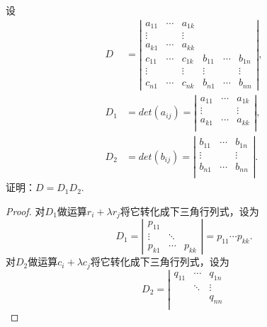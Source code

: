 \documentclass[10pt,a4paper%
tablecaptionabove]{article}
\newcommand{\cd}{\cdots}
\newcommand{\dd}{\ddots}
\newcommand{\vd}{\vdots}
\begin{document}
\begin{CJK}{UTF8}{gkai}
\begin{li}
  设
  $$
  \begin{aligned}
    D &= \left|
      \begin{array}{cccccc}
        a_{11} & \cd & a_{1k} &    &    &   \\
        \vd    &     &  \vd  &    &    &   \\
        a_{k1} & \cd & a_{kk} &    &    &   \\
        c_{11} & \cd & c_{1k} & b_{11}&  \cd & b_{1n}   \\
        \vd    &     & \vd   & \vd  &    & \vd \\
        c_{n1} & \cd & c_{nk} & b_{n1}&  \cd & b_{nn}
      \end{array}
    \right|, \\
    D_1 &= det(a_{ij}) = \left|
      \begin{array}{ccc}
        a_{11} & \cd & a_{1k} \\
        \vd    &     &  \vd  \\
        a_{k1} & \cd & a_{kk} \\
      \end{array}
    \right|, \\
    D_2 & = det(b_{ij}) = \left|
      \begin{array}{ccc}
        b_{11} & \cd & b_{1n} \\
        \vd    &     &  \vd  \\
        b_{n1} & \cd & b_{nn} \\
      \end{array}
    \right|.
  \end{aligned}
  $$
  证明：$D=D_1D_2$.
\end{li}
\begin{proof}
  对$D_1$做运算$r_i+\lambda r_j$将它转化成下三角行列式，设为
  $$
  D_1 =  \left|
    \begin{array}{ccc}
      p_{11} &       & \\
      \vd    & \dd  &  \\
      p_{k1} & \cd   & p_{kk} 
    \end{array}
  \right| = p_{11} \cd p_{kk}.
  $$ 
  对$D_2$做运算$c_i+\lambda c_j$将它转化成下三角行列式，设为
  $$
  D_2 =  \left|
    \begin{array}{ccc}
      q_{11} & \cd  &  q_{1n}\\
             & \dd  &  \vd \\
             &      & q_{nn} \\
    \end{array}
$$
\end{proof}
\end{CJK}
\end{document}
